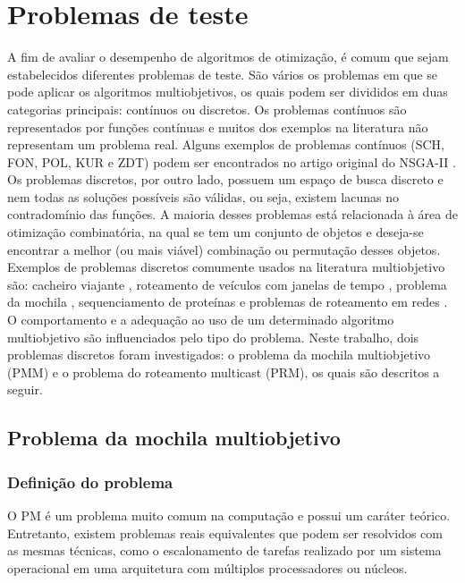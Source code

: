 \chapter[Problemas de teste]{Problemas de teste}

A fim de avaliar o desempenho de algoritmos de otimização, é comum que sejam estabelecidos diferentes problemas de teste. São vários os problemas em que se pode aplicar os algoritmos multiobjetivos, os quais podem ser divididos em duas categorias principais: contínuos ou discretos. Os problemas contínuos são representados por funções contínuas e muitos dos exemplos na literatura não representam um problema real. Alguns exemplos de problemas contínuos (SCH, FON, POL, KUR e ZDT) podem ser encontrados no artigo original do NSGA-II \cite{Deb2002}. Os problemas discretos, por outro lado, possuem um espaço de busca discreto e nem todas as soluções possíveis são válidas, ou seja, existem lacunas no contradomínio das funções. A maioria desses problemas está relacionada à área de otimização combinatória, na qual se tem um conjunto de objetos e deseja-se encontrar a melhor (ou mais viável) combinação ou permutação desses objetos. Exemplos de problemas discretos comumente usados na literatura multiobjetivo são: cacheiro viajante \cite{MTSP}, roteamento de veículos com janelas de tempo \cite{VehicleRouting}, problema da mochila \cite{MKP}, sequenciamento de proteínas \cite{Brasil2013} e problemas de roteamento em redes \cite{Lafeta2017}. O comportamento e a adequação ao uso de um determinado algoritmo multiobjetivo são influenciados pelo tipo do problema. Neste trabalho, dois problemas discretos foram investigados: o problema da mochila multiobjetivo (PMM) e o problema do roteamento multicast (PRM), os quais são descritos a seguir.

\section{Problema da mochila multiobjetivo}
\label{section_problemas_pmm}

\subsection{Definição do problema}

O \ac{PM} é um problema muito comum na computação e possui um caráter teórico. Entretanto, existem problemas reais equivalentes que podem ser resolvidos com as mesmas técnicas, como o escalonamento de tarefas realizado por um sistema operacional em uma arquitetura com múltiplos processadores ou núcleos.

